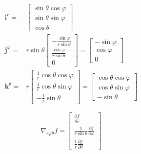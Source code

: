 \documentclass
[
a4paper,                      %
twoside,					  %
12pt,                         %
abstract,		      %
fleqn,                        %
]
{scrartcl} %
\begin{document}
\begin{description}
\begin{equation}
\begin{aligned}
\mathbf{i}^{r}=&\begin{bmatrix}
\sin{\theta}\cos{\varphi}\\[5pt]
\sin{\theta}\sin{\varphi}\\[5pt]
\cos{\theta}\end{bmatrix}\\
\mathbf{j}^{\varphi}=&r\sin{\theta}\begin{bmatrix}
-\frac{\sin{\varphi}}{r\sin{\theta}}\\[5pt]
\frac{\cos{\varphi}}{r\sin{\theta}}\\[5pt]
0\end{bmatrix}=\begin{bmatrix}
-\sin{\varphi}\\[5pt]
\cos{\varphi}\\[5pt]
0\end{bmatrix}\\
\mathbf{k}^{\theta}=&r\begin{bmatrix}
\frac{1}{r}\cos{\theta}\cos{\varphi}\\[5pt]
\frac{1}{r}\cos{\theta}\sin{\varphi}\\[5pt]
-\frac{1}{r}\sin{\theta}
\end{bmatrix}=\begin{bmatrix}
\cos{\theta}\cos{\varphi}\\[5pt]
\cos{\theta}\sin{\varphi}\\[5pt]
-\sin{\theta}
\end{bmatrix}
\end{aligned}
\end{equation}

\begin{equation}
\nabla_{r\varphi\theta} f=\begin{bmatrix}
\frac{\partial f}{\partial r}\\[10pt]
\frac{1}{r\sin{\theta}}\frac{\partial f}{\partial\varphi}\\[10pt]
\frac{1}{r}\frac{\partial f}{\partial\theta}
\end{bmatrix}
\end{equation}

\end{description}


\clearscrheadings
\pagestyle{scrheadings}
\manualmark
\ofoot{\\\pagemark} %
\setheadtopline{2pt}
\setheadsepline{0.5pt}
\setfootsepline{0.5pt}
\end{document}
